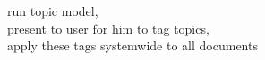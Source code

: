\documentclass[letterpaper,12pt]{article}
\begin{document}
		run topic model, \\
		present to user for him to tag topics, \\
		apply these tags systemwide to all documents
		
	
		



\end{document}
